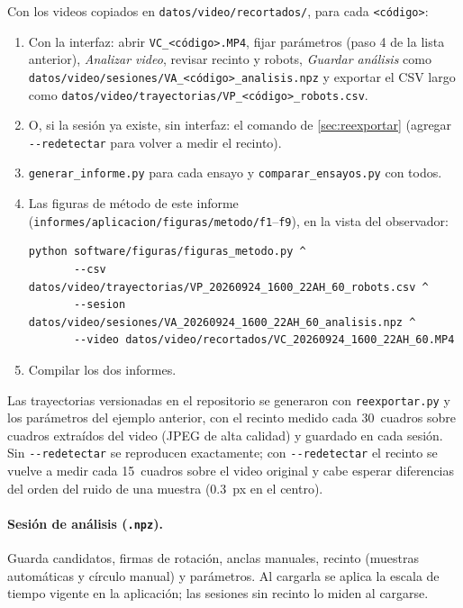 Con los videos copiados en \nolinkurl{datos/video/recortados/}, para cada \texttt{<código>}:
\begin{enumerate}
  \item Con la interfaz: abrir \texttt{VC\_<código>.MP4}, fijar parámetros (paso 4 de la lista
        anterior), \emph{Analizar video}, revisar recinto y robots, \emph{Guardar análisis} como
        \nolinkurl{datos/video/sesiones/VA_<código>_analisis.npz} y exportar el CSV largo como
        \nolinkurl{datos/video/trayectorias/VP_<código>_robots.csv}.
  \item O, si la sesión ya existe, sin interfaz: el comando de \cref{sec:reexportar}
        (agregar \texttt{-{}-redetectar} para volver a medir el recinto).
  \item \texttt{generar\_informe.py} para cada ensayo y \texttt{comparar\_ensayos.py} con todos.
  \item Las figuras de método de este informe (\nolinkurl{informes/aplicacion/figuras/metodo/f1}--\texttt{f9}),
        en la vista del observador:
\begin{verbatim}
python software/figuras/figuras_metodo.py ^
       --csv datos/video/trayectorias/VP_20260924_1600_22AH_60_robots.csv ^
       --sesion datos/video/sesiones/VA_20260924_1600_22AH_60_analisis.npz ^
       --video datos/video/recortados/VC_20260924_1600_22AH_60.MP4
\end{verbatim}
  \item Compilar los dos informes.
\end{enumerate}
Las trayectorias versionadas en el repositorio se generaron con \texttt{reexportar.py} y los parámetros
del ejemplo anterior, con el recinto medido cada \num{30}~cuadros sobre cuadros extraídos del video
(JPEG de alta calidad) y guardado en cada sesión. Sin \texttt{-{}-redetectar} se reproducen exactamente;
con \texttt{-{}-redetectar} el recinto se vuelve a medir cada \num{15}~cuadros sobre el video original y
cabe esperar diferencias del orden del ruido de una muestra (\SI{0.3}{px} en el centro).

\paragraph{Sesión de análisis (\texttt{.npz}).} Guarda candidatos, firmas de rotación, anclas
manuales, recinto (muestras automáticas y círculo manual) y parámetros. Al cargarla se aplica la escala
de tiempo vigente en la aplicación; las sesiones sin recinto lo miden al cargarse.
